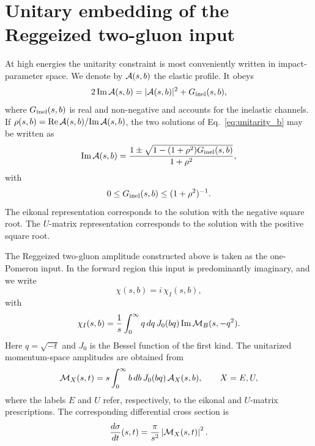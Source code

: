 \documentclass[aps,prd,twocolumn,superscriptaddress,longbibliography,nofootinbib]{revtex4-2}
\begin{document}
\section{Unitary embedding of the Reggeized two-gluon input}
\label{sec:unitary_embedding}


At high energies the unitarity constraint is most conveniently written
in impact-parameter space. We denote by ${\cal A}(s,b)$ the elastic
profile. It obeys
\begin{equation}
2\,\mbox{Im}\,{\cal A}(s,b)
=
|{\cal A}(s,b)|^2+G_{\rm inel}(s,b),
\label{eq:unitarity_b}
\end{equation}
where $G_{\rm inel}(s,b)$ is real and non-negative and accounts for the
inelastic channels. If
$\rho(s,b)=\mbox{Re}\,{\cal A}(s,b)/\mbox{Im}\,{\cal A}(s,b)$, the two
solutions of Eq.~\eqref{eq:unitarity_b} may be written as
\begin{equation}
\mbox{Im}\,{\cal A}(s,b)
=
\frac{
1\pm
\sqrt{1-(1+\rho^2)G_{\rm inel}(s,b)}
}
{1+\rho^2},
\label{eq:unitarity_solutions}
\end{equation}
with
\begin{equation}
0\leq G_{\rm inel}(s,b)\leq (1+\rho^2)^{-1}.
\label{eq:ginel_bound}
\end{equation}
The eikonal representation corresponds to the solution with the negative
square root. The $U$-matrix representation corresponds to the solution
with the positive square root.

The Reggeized two-gluon amplitude constructed above is taken as the
one-Pomeron input. In the forward region this input is predominantly
imaginary, and we write
\begin{equation}
\chi(s,b)=i\,\chi_I(s,b),
\label{eq:chi_chiI}
\end{equation}
with
\begin{equation}
\chi_I(s,b)
=
\frac{1}{s}
\int_0^\infty q\,dq\,
J_0(bq)\,
\mbox{Im}\,{\cal M}_B(s,-q^2).
\label{eq:chiI_def}
\end{equation}
Here $q=\sqrt{-t}$ and $J_0$ is the Bessel function of the first kind.
The unitarized momentum-space amplitudes are obtained from
\begin{equation}
{\cal M}_X(s,t)
=
s\int_0^\infty b\,db\,
J_0(bq)\,
{\cal A}_X(s,b),
\qquad X=E,U,
\label{eq:unit_amplitude}
\end{equation}
where the labels $E$ and $U$ refer, respectively, to the eikonal and
$U$-matrix prescriptions. The corresponding differential cross section
is
\begin{equation}
\frac{d\sigma}{dt}(s,t)
=
\frac{\pi}{s^2}
\left|{\cal M}_X(s,t)\right|^2 .
\label{eq:unit_dsdt}
\end{equation}
\end{document}
